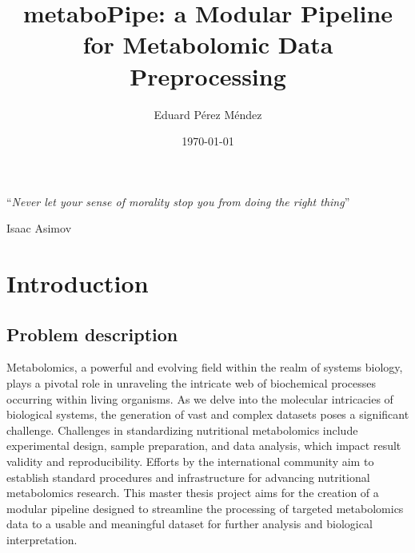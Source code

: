 \documentclass[ENG, BIB]{TFUOC}%
\title{metaboPipe: a Modular Pipeline for Metabolomic Data Preprocessing}
\author{Eduard Pérez Méndez}
\date{\today}
\begin{document}
            
            \estructura
            
            \newpage\null\thispagestyle{empty}
            
            \vspace*{0.4\textheight} 
            
            \noindent\enquote{\itshape Never let your sense of morality stop you from doing the right thing}\bigbreak 
            
            
            

            \hfill Isaac Asimov
            
            \newpage
            
            
            \tableofcontents
            
\listoffigures

\listoftables



\chapter{Introduction}

\section{Problem description}

Metabolomics, a powerful and evolving field within the realm of systems biology, plays a pivotal role in unraveling the intricate web of biochemical processes occurring within living organisms. As we delve into the molecular intricacies of biological systems, the generation of vast and complex datasets poses a significant challenge. Challenges in standardizing nutritional metabolomics include experimental design, sample preparation, and data analysis, which impact result validity and reproducibility. Efforts by the international community aim to establish standard procedures and infrastructure for advancing nutritional metabolomics research. This master thesis project aims for the creation of a modular pipeline designed to streamline the processing of targeted metabolomics data to a usable and meaningful dataset for further analysis and biological interpretation.
\end{document}
